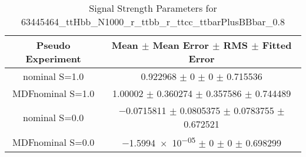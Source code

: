 \begin{table}
\centering
\caption{Signal Strength Parameters for 63445464\_ttHbb\_N1000\_r\_ttbb\_r\_ttcc\_ttbarPlusBBbar\_0.8}
\begin{tabular}{cc}
\toprule
Pseudo Experiment & Mean $\pm$ Mean Error $\pm$ RMS $\pm$ Fitted Error\\
\midrule
nominal S=1.0 & \num{0.922968} $\pm$ \num{0} $\pm$ \num{0} $\pm$ \num{0.715536}\\
MDFnominal S=1.0 & \num{1.00002} $\pm$ \num{0.360274} $\pm$ \num{0.357586} $\pm$ \num{0.744489}\\
nominal S=0.0 & \num{-0.0715811} $\pm$ \num{0.0805375} $\pm$ \num{0.0783755} $\pm$ \num{0.672521}\\
MDFnominal S=0.0 & \num{-1.5994e-05} $\pm$ \num{0} $\pm$ \num{0} $\pm$ \num{0.698299}\\
\bottomrule
\end{tabular}
\end{table}